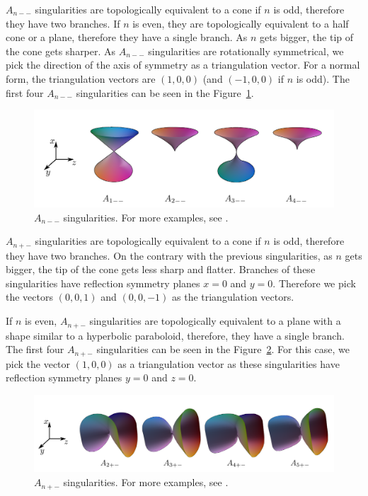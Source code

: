 $A_{n--}$ singularities are topologically equivalent to a cone if $n$ is odd, therefore
they have two branches.
If $n$ is even, they are topologically equivalent to a half cone or a plane, therefore
they have a single branch.
As $n$ gets bigger, the tip of the cone gets sharper. As $A_{n--}$ singularities
are rotationally symmetrical, we pick the direction of
the axis of symmetry as a triangulation vector. For a normal form, the triangulation vectors
are $(1, 0, 0)$ (and $(-1, 0, 0)$ if $n$ is odd).
The first four $A_{n--}$ singularities can be seen in the Figure~\ref{img:4}.

\begin{figure}
    \centerline{\includegraphics[scale=0.5]{images/img4}}
    \caption[$A_{n--}$ singularities]
    {$A_{n--}$ singularities. For more examples, see \cite{morris2003client}.}
    \label{img:4}
\end{figure}


$A_{n+-}$ singularities are topologically equivalent to a cone if $n$ is odd, therefore
they have two branches.
On the contrary with the previous singularities, as $n$ gets bigger, the tip
of the cone gets less sharp and flatter. Branches of these singularities have 
reflection symmetry planes $x=0$ and $y=0$. Therefore we pick the vectors
$(0, 0, 1)$ and $(0, 0, -1)$ as the triangulation vectors.

If $n$ is even, $A_{n+-}$ singularities are topologically equivalent to a plane
with a shape similar to a hyperbolic paraboloid, therefore, they have a single branch.
The first four $A_{n+-}$ singularities can be seen in the Figure~\ref{img:5}.
For this case, we pick the vector $(1, 0, 0)$ as a triangulation vector as
these singularities have reflection symmetry planes $y=0$ and $z=0$.

\begin{figure}
    \centerline{\includegraphics[scale=0.5]{images/img5}}
    \caption[$A_{n+-}$ singularities]
    {$A_{n+-}$ singularities. For more examples, see \cite{morris2003client}.}
    \label{img:5}
\end{figure}

